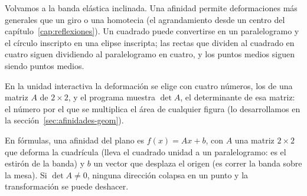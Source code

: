 Volvamos a la banda elástica inclinada. Una afinidad permite deformaciones más
generales que un giro o una homotecia (el agrandamiento desde un centro del
capítulo~\ref{cap:reflexiones}). Un cuadrado puede convertirse en un paralelogramo y el
círculo inscripto en una elipse inscripta; las rectas que dividen al cuadrado en cuatro siguen
dividiendo al paralelogramo en cuatro, y los puntos medios siguen siendo puntos medios.

\begin{center}
\end{center}

En la unidad interactiva la deformación se elige con cuatro números, los de una matriz \(A\) de
\(2\times2\), y el programa muestra \(\det A\), el determinante de esa matriz: el número por el
que se multiplica el área de cualquier figura (lo desarrollamos en la
sección~\ref{sec:afinidades-geom}).


En fórmulas, una afinidad del plano es \(f(x)=Ax+b\), con \(A\) una matriz \(2\times2\) que
deforma la cuadrícula (lleva el cuadrado unidad a un paralelogramo: es el estirón de la banda)
y \(b\) un vector que desplaza el origen (es correr la banda sobre la mesa). Si \(\det A\neq0\),
ninguna dirección colapsa en un punto y la transformación se puede deshacer.


